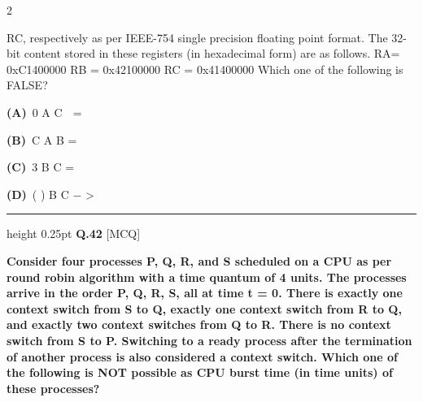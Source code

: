 \documentclass[a4paper,10pt,twoside]{article}
\begin{document}
\begin{multicols}{2}
{RC, respectively as per IEEE-754 single precision floating point format. The 32-bit
content stored in these registers (in hexadecimal form) are as follows.
RA= 0xC1400000
RB = 0x42100000
RC = 0x41400000
Which one of the following is FALSE? \par}
\par\vspace{2pt}\noindent
\textbf{(A)}~0 \newline A \newline C \newline  \newline =\par\vspace{2pt}\noindent
\textbf{(B)}~C \newline A \newline B \newline = \newline \par\vspace{2pt}\noindent
\textbf{(C)}~3 \newline B \newline C \newline =\par\vspace{2pt}\noindent
\textbf{(D)}~( \newline )  \newline B \newline C \newline − \newline >
\par\vspace{6pt}\hrule height 0.25pt\vspace{6pt}
\noindent\textbf{Q.42} \hfill {\footnotesize\textsf{[MCQ]}}
\par\vspace{2pt}
{\bfseries Consider four processes P, Q, R, and S scheduled on a CPU as per round robin
algorithm with a time quantum of 4 units. The processes arrive in the order P, Q, R,
S, all at time t = 0. There is exactly one context switch from S to Q, exactly one
context switch from R to Q, and exactly two context switches from Q to R. There is
no context switch from S to P. Switching to a ready process after the termination of
another process is also considered a context switch. Which one of the following is
NOT possible as CPU burst time (in time units) of these processes? \par}
\par\vspace{2pt}\noindent

\end{multicols}
\end{document}
